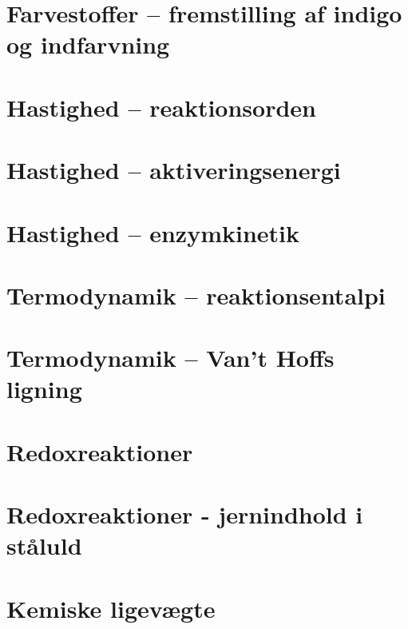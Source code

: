 \documentclass[10pt,a4paper]{article}
\theoremstyle{break}
\theoremstyle{nonumberplain}
\begin{document}
\section{Farvestoffer – fremstilling af indigo og indfarvning}

\pagebreak


\section{Hastighed – reaktionsorden}

\pagebreak


\section{Hastighed – aktiveringsenergi}

\pagebreak


\section{Hastighed – enzymkinetik}

\pagebreak


\section{Termodynamik – reaktionsentalpi}

\pagebreak


\section{Termodynamik – Van’t Hoffs ligning}

\pagebreak

\section{Redoxreaktioner}

\pagebreak


\section{Redoxreaktioner - jernindhold i ståluld}

\pagebreak


\section{Kemiske ligevægte}
\end{document}
